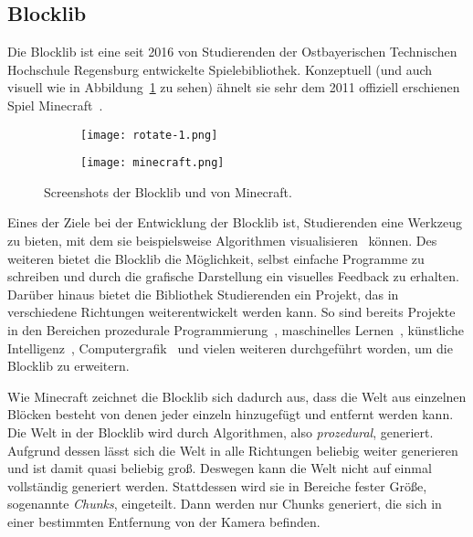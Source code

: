 \subsection{Blocklib}
Die Blocklib ist eine seit 2016 von Studierenden der Ostbayerischen Technischen Hochschule Regensburg entwickelte Spielebibliothek. Konzeptuell (und auch visuell wie in Abbildung~\ref{fig:blocklibminecraft} zu sehen) ähnelt sie sehr dem 2011 offiziell erschienen Spiel Minecraft~\cite{Mojang}.
\begin{figure}[!htbp]
	\begin{subfigure}[b]{.49\textwidth}
		\texttt{[image: rotate-1.png]}
	\end{subfigure}
	\begin{subfigure}[b]{.49\textwidth}
		\texttt{[image: minecraft.png]}
	\end{subfigure}
	\caption{Screenshots der Blocklib und von Minecraft.}\label{fig:blocklibminecraft}
\end{figure}
Eines der Ziele bei der Entwicklung der Blocklib ist, Studierenden eine Werkzeug zu bieten, mit dem sie beispielsweise Algorithmen visualisieren~\cite{Helgert2018} können. Des weiteren bietet die Blocklib die Möglichkeit, selbst einfache Programme zu schreiben und durch die grafische Darstellung ein visuelles Feedback zu erhalten. Darüber hinaus bietet die Bibliothek Studierenden ein Projekt, das in verschiedene Richtungen weiterentwickelt werden kann. So sind bereits Projekte in den Bereichen prozedurale Programmierung~\cite{Beer2017,Ebbinger2018a,Kalle2018,Sellner2020,Kohler2021}, maschinelles Lernen~\cite{Mayer2021}, künstliche Intelligenz~\cite{Amthor2017,Weidner2018,Bunke2021,Mayer2021}, Computergrafik~\cite{Zink2016,Ebbinger2018,Werner2018} und vielen weiteren durchgeführt worden, um die Blocklib zu erweitern.

Wie Minecraft zeichnet die Blocklib sich dadurch aus, dass die Welt aus einzelnen Blöcken besteht von denen jeder einzeln hinzugefügt und entfernt werden kann. Die Welt in der Blocklib wird durch Algorithmen, also \emph{prozedural}, generiert. Aufgrund dessen lässt sich die Welt in alle Richtungen beliebig weiter generieren und ist damit quasi beliebig groß. Deswegen kann die Welt nicht auf einmal vollständig generiert werden. Stattdessen wird sie in Bereiche fester Größe, sogenannte \emph{Chunks}, eingeteilt. Dann werden nur Chunks generiert, die sich in einer bestimmten Entfernung von der Kamera befinden.

